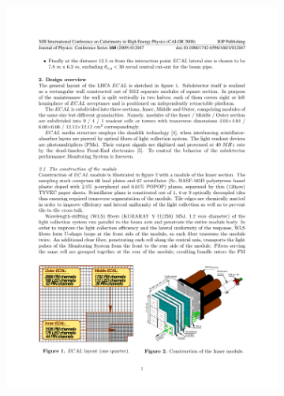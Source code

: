 \begin{figure}[!h]
    \centering
    \begin{subfigure}[m]{0.4\textwidth}
        \centering        
        \includegraphics[width=1.0\textwidth]{figs/Detector/ecal_diagram.pdf}
    \end{subfigure}
    \begin{subfigure}[m]{0.4\textwidth}
        \centering

\end{subfigure}
\end{figure}
